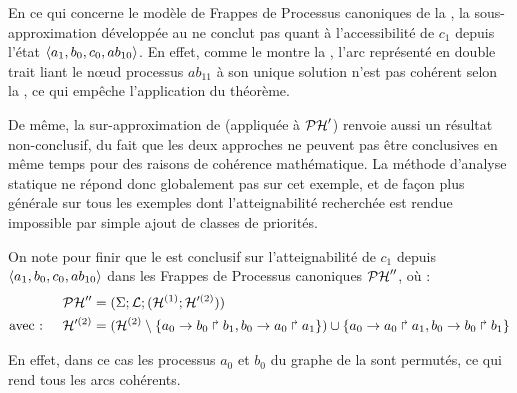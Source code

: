 \begin{example}
  En ce qui concerne le modèle de Frappes de Processus canoniques de la ,
  la sous-approximation développée au 
  ne conclut pas quant à l'accessibilité de $c_1$ depuis l'état
  $\mbox{$\langle a_1, b_0, c_0, ab_{10} \rangle$}$.
  En effet, comme le montre la ,
  l'arc représenté en double trait liant le nœud processus $ab_{11}$ à son unique solution
  n'est pas cohérent selon la
  , ce qui empêche l'application du théorème.
  
  De même, la sur-approximation de  (appliquée à $\mathcal{PH}'$)
  renvoie aussi un résultat non-conclusif,
  du fait que les deux approches ne peuvent pas être conclusives en même temps
  pour des raisons de cohérence mathématique.
  La méthode d'analyse statique ne répond donc globalement pas sur cet exemple,
  et de façon plus générale sur tous les exemples dont l'atteignabilité recherchée
  est rendue impossible par simple ajout de classes de priorités.
  
  On note pour finir que le  est conclusif sur l'atteignabilité de $c_1$
  depuis $\mbox{$\langle a_1, b_0, c_0, ab_{10} \rangle$}$ dans les Frappes de Processus canoniques $\mathcal{PH}''$, où :
  \begin{align*}
  \mathcal{PH}'' &= (\Sigma; \mathcal{L}; (\mathcal{H}^{(1)};\mathcal{H}'^{(2)})) \\
  \text{avec : } \quad
  \mathcal{H}'^{(2)} &= (\mathcal{H}^{(2)} \setminus \{ a_0\rightarrow b_0\Rsh b_1, b_0\rightarrow a_0\Rsh a_1 \})
    \cup \{ a_0\rightarrow a_0\Rsh a_1, b_0\rightarrow b_0\Rsh b_1 \}
  \end{align*}

  En effet, dans ce cas les processus $a_0$ et $b_0$ du graphe de la 
  sont permutés, ce qui rend tous les arcs cohérents.
  
  \begin{figure}[tp]
    \centering
\end{figure}
\end{example}

